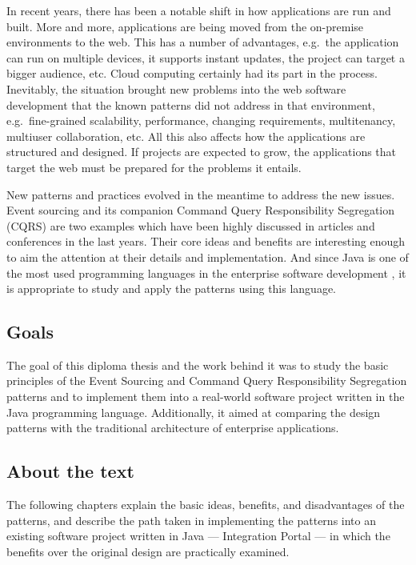 \documentclass{book}
\begin{document}
In recent years, there has been a notable shift in how applications are
run and built. More and more, applications are being moved from the
on-premise environments to the web. This has a number of advantages,
e.g.~the application can run on multiple devices, it supports instant
updates, the project can target a bigger audience, etc. Cloud computing
certainly had its part in the process. Inevitably, the situation brought
new problems into the web software development that the known patterns
did not address in that environment, e.g.~fine-grained scalability,
performance, changing requirements, multitenancy, multiuser
collaboration, etc. All this also affects how the applications are
structured and designed. If projects are expected to grow, the
applications that target the web must be prepared for the problems it
entails.

New patterns and practices evolved in the meantime to address the new
issues. Event sourcing and its companion Command Query Responsibility
Segregation (CQRS) are two examples which have been highly discussed in
articles and conferences in the last years. Their core ideas and
benefits are interesting enough to aim the attention at their details
and implementation. And since Java is one of the most used programming
languages in the enterprise software development \cite{java}, it is
appropriate to study and apply the patterns using this language.

\subsection{Goals}\label{goals}

The goal of this diploma thesis and the work behind it was to study the
basic principles of the Event Sourcing and Command Query Responsibility
Segregation patterns and to implement them into a real-world software
project written in the Java programming language. Additionally, it aimed
at comparing the design patterns with the traditional architecture of
enterprise applications.

\subsection{About the text}\label{about-the-text}

The following chapters explain the basic ideas, benefits, and
disadvantages of the patterns, and describe the path taken in
implementing the patterns into an existing software project written in
Java --- Integration Portal --- in which the benefits over the original
design are practically examined.
\end{document}
